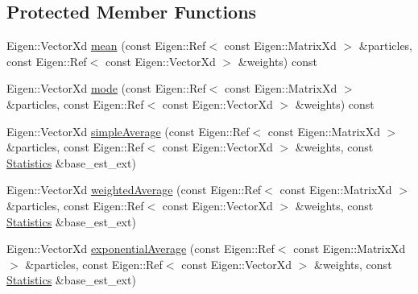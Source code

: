 \subsection*{Protected Member Functions}
\begin{DoxyCompactItemize}
\item 
Eigen\+::\+Vector\+Xd \mbox{\hyperlink{classbfl_1_1EstimatesExtraction_ace45246c5dcc502d5c79a8db2b2f388f}{mean}} (const Eigen\+::\+Ref$<$ const Eigen\+::\+Matrix\+Xd $>$ \&particles, const Eigen\+::\+Ref$<$ const Eigen\+::\+Vector\+Xd $>$ \&weights) const
\item 
Eigen\+::\+Vector\+Xd \mbox{\hyperlink{classbfl_1_1EstimatesExtraction_ab8ea456201aa9546acb214dbc006384c}{mode}} (const Eigen\+::\+Ref$<$ const Eigen\+::\+Matrix\+Xd $>$ \&particles, const Eigen\+::\+Ref$<$ const Eigen\+::\+Vector\+Xd $>$ \&weights) const
\item 
Eigen\+::\+Vector\+Xd \mbox{\hyperlink{classbfl_1_1EstimatesExtraction_a443e7df78f1c5fa0967afcb64109ca3b}{simple\+Average}} (const Eigen\+::\+Ref$<$ const Eigen\+::\+Matrix\+Xd $>$ \&particles, const Eigen\+::\+Ref$<$ const Eigen\+::\+Vector\+Xd $>$ \&weights, const \mbox{\hyperlink{classbfl_1_1EstimatesExtraction_a8c0593a43166c569530947107c830462}{Statistics}} \&base\+\_\+est\+\_\+ext)
\item 
Eigen\+::\+Vector\+Xd \mbox{\hyperlink{classbfl_1_1EstimatesExtraction_ade9a34ad46d2f68f0e98f52035b21f3c}{weighted\+Average}} (const Eigen\+::\+Ref$<$ const Eigen\+::\+Matrix\+Xd $>$ \&particles, const Eigen\+::\+Ref$<$ const Eigen\+::\+Vector\+Xd $>$ \&weights, const \mbox{\hyperlink{classbfl_1_1EstimatesExtraction_a8c0593a43166c569530947107c830462}{Statistics}} \&base\+\_\+est\+\_\+ext)
\item 
Eigen\+::\+Vector\+Xd \mbox{\hyperlink{classbfl_1_1EstimatesExtraction_afbba6972a0b2df1d60c67e364c7e1364}{exponential\+Average}} (const Eigen\+::\+Ref$<$ const Eigen\+::\+Matrix\+Xd $>$ \&particles, const Eigen\+::\+Ref$<$ const Eigen\+::\+Vector\+Xd $>$ \&weights, const \mbox{\hyperlink{classbfl_1_1EstimatesExtraction_a8c0593a43166c569530947107c830462}{Statistics}} \&base\+\_\+est\+\_\+ext)
\end{DoxyCompactItemize}
